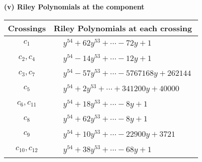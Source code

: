 \documentclass[1p]{elsarticle_modified}
\theoremstyle{definition}
\begin{document}
\newpage\renewcommand{\arraystretch}{1}
\flushleft \textbf{(v) Riley Polynomials at the component}\newline \\
\begin{tabular}{m{50pt}|m{274pt}}
Crossings & \hspace{64pt}Riley Polynomials at each crossing \\
\hline $$\begin{aligned}c_{1}\end{aligned}$$&$\begin{aligned}
&y^{54}+62 y^{53}+\cdots-72 y+1
\end{aligned}$\\
\hline $$\begin{aligned}c_{2},c_{4}\end{aligned}$$&$\begin{aligned}
&y^{54}-14 y^{53}+\cdots-12 y+1
\end{aligned}$\\
\hline $$\begin{aligned}c_{3},c_{7}\end{aligned}$$&$\begin{aligned}
&y^{54}-57 y^{53}+\cdots-5767168 y+262144
\end{aligned}$\\
\hline $$\begin{aligned}c_{5}\end{aligned}$$&$\begin{aligned}
&y^{54}+2 y^{53}+\cdots+341200 y+40000
\end{aligned}$\\
\hline $$\begin{aligned}c_{6},c_{11}\end{aligned}$$&$\begin{aligned}
&y^{54}+18 y^{53}+\cdots-8 y+1
\end{aligned}$\\
\hline $$\begin{aligned}c_{8}\end{aligned}$$&$\begin{aligned}
&y^{54}+62 y^{53}+\cdots-8 y+1
\end{aligned}$\\
\hline $$\begin{aligned}c_{9}\end{aligned}$$&$\begin{aligned}
&y^{54}+10 y^{53}+\cdots-22900 y+3721
\end{aligned}$\\
\hline $$\begin{aligned}c_{10},c_{12}\end{aligned}$$&$\begin{aligned}
&y^{54}+38 y^{53}+\cdots-68 y+1
\end{aligned}$\\
\hline
\end{tabular}\\~\\
\end{document}
